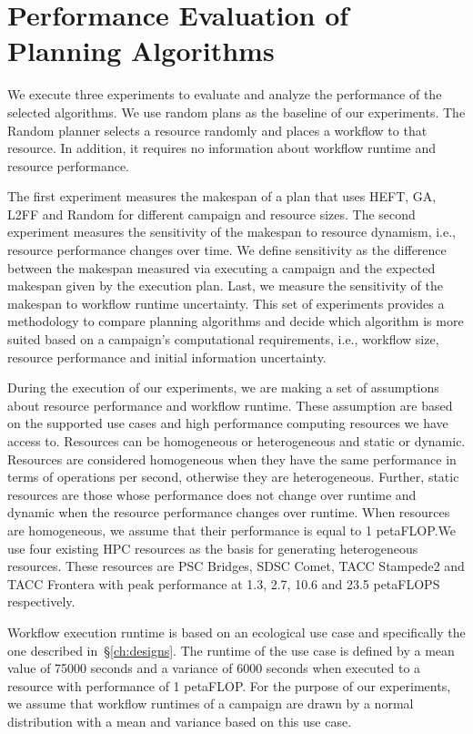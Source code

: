 \section{Performance Evaluation of Planning Algorithms}
\label{sec:algo_perf_comp}

We execute three experiments to evaluate and analyze the performance of the
selected algorithms. We use random plans as the baseline of our experiments.
The Random planner selects a resource randomly and places a workflow to that
resource. In addition, it requires no information about workflow runtime and
resource performance.

The first experiment measures the makespan of a plan that uses HEFT, GA, L2FF
and Random for different campaign and resource sizes. The second experiment
measures the sensitivity of the makespan to resource dynamism, i.e., resource
performance changes over time. We define sensitivity as the difference between
the makespan measured via executing a campaign and the expected makespan given
by the execution plan. Last, we measure the sensitivity of the makespan to
workflow runtime uncertainty. This set of experiments provides a methodology
to compare planning algorithms and decide which algorithm is more suited based
on a campaign's computational requirements, i.e., workflow size, resource
performance and initial information uncertainty.

During the execution of our experiments, we are making a set of assumptions
about resource performance and workflow runtime. These assumption are based on
the supported use cases and high performance computing resources we have
access to. Resources can be homogeneous or heterogeneous and static or dynamic.
Resources are considered homogeneous when they have the same performance in
terms of operations per second, otherwise they are heterogeneous. Further,
static resources are those whose performance does not change over runtime and
dynamic when the resource performance changes over runtime. When resources are
homogeneous, we assume that their performance is equal to 1 petaFLOP.We use
four existing HPC resources as the basis for generating heterogeneous
resources. These resources are PSC Bridges, SDSC Comet, TACC Stampede2 and
TACC Frontera with peak performance at 1.3, 2.7, 10.6 and 23.5 petaFLOPS
respectively.

Workflow execution runtime is based on an ecological use case and specifically
the one described in~\S\ref{ch:designs}. The runtime of the use case is
defined by a mean value of 75000 seconds and a variance of 6000 seconds when
executed to a resource with performance of 1 petaFLOP. For the purpose of our
experiments, we assume that workflow runtimes of a campaign are drawn by a
normal distribution with a mean and variance based on this use case.


